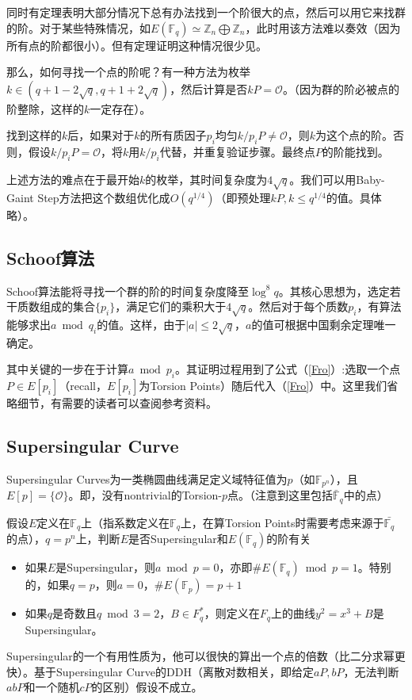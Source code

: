 \documentclass[12pt]{article}
\newcommand{\oo}{\mathcal{O}}
\newcommand{\fp}{\mathbb{F}_p}
\newcommand{\fpn}{\mathbb{F}_{p^n}}
\newcommand{\fq}{\mathbb{F}_q}
\begin{document}
同时有定理表明大部分情况下总有办法找到一个阶很大的点，然后可以用它来找群的阶。对于某些特殊情况，如$E(\mathbb{F}_q) \simeq \mathbb{Z}_n \bigoplus  \mathbb{Z}_n$，此时用该方法难以奏效（因为所有点的阶都很小）。但有定理证明这种情况很少见。

那么，如何寻找一个点的阶呢？有一种方法为枚举$k \in (q+1-2\sqrt{q},q+1+2\sqrt{q})$，然后计算是否$kP = \oo$。（因为群的阶必被点的阶整除，这样的$k$一定存在）。

找到这样的$k$后，如果对于$k$的所有质因子$p_i$均匀$k/p_i P \neq \oo$，则$k$为这个点的阶。否则，假设$k/p_i P = \oo$，将$k$用$k/p_i$代替，并重复验证步骤。最终点$P$的阶能找到。

上述方法的难点在于最开始$k$的枚举，其时间复杂度为$4\sqrt{q}$。我们可以用Baby-Gaint Step方法把这个数组优化成$O(q^{1/4})$（即预处理$kP, k \leq q^{1/4}$的值。具体略）。
\subsection{Schoof算法}
Schoof算法能将寻找一个群的阶的时间复杂度降至$\log^8 q$。其核心思想为，选定若干质数组成的集合$\{p_i\}$，满足它们的乘积大于$4\sqrt{q}$。然后对于每个质数$p_i$，有算法能够求出$a \bmod q_i$的值。这样，由于$|a| \leq 2\sqrt{q}$，$a$的值可根据中国剩余定理唯一确定。

其中关键的一步在于计算$a \bmod p_i$。其证明过程用到了公式（\ref{Fro}）:选取一个点$P \in E[p_i]$（recall，$E[p_i]$为Torsion Points）随后代入（\ref{Fro}）中。这里我们省略细节，有需要的读者可以查阅参考资料。
\subsection{Supersingular Curve}
Supersingular Curves为一类椭圆曲线满足定义域特征值为$p$（如$\fpn$），且$E[p] = \{\oo \}$。即，没有nontrivial的Torsion-$p$点。（注意到这里包括$\bar{\mathbb{F}}_q$中的点）

假设$E$定义在$\fq$上（指系数定义在$\fq$上，在算Torsion Points时需要考虑来源于$\bar{\mathbb{F}_q}$的点），$q=p^n$上，判断$E$是否Supersingular和$E(\fq)$的阶有关
\begin{itemize}
	\item 如果$E$是Supersingular，则$a \bmod p =0$，亦即$\# E(\fq) \bmod p =1$。特别的，如果$q=p$，则$a=0$，$\# E(\fp)=p+1$
	\item 如果$q$是奇数且$q \bmod 3=2$，$B \in F^*_q$，则定义在$F_q$上的曲线$y^2=x^3+B$是Supersingular。
\end{itemize}
Supersingular的一个有用性质为，他可以很快的算出一个点的倍数（比二分求幂更快）。基于Supersingular Curve的DDH（离散对数相关，即给定$aP,bP$，无法判断$abP$和一个随机$cP$的区别）假设不成立。
\end{document}
